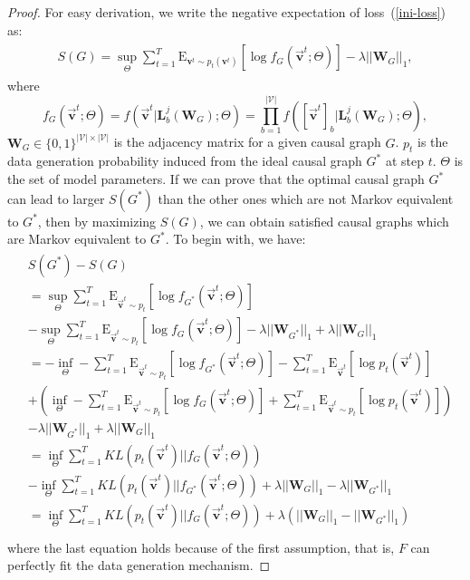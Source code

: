 \documentclass[conference]{IEEEtran}
\theoremstyle{definition}
\theoremstyle{theorem}
\theoremstyle{proof}
\theoremstyle{remark}
\begin{document}
\begin{proof}
	For easy derivation, we write the negative expectation of loss~(\ref{ini-loss}) as: 
		\begin{eqnarray}\label{noteee}
			\begin{aligned}
				S(G)\!=\!\sup_{\Theta} \sum_{t=1}^{T}\text{E}_{\bm{v}^t \sim p_t(\bm{v}^t)} [\log f_G(\vec{\bm{v}}^t;\Theta)] - \lambda||\bm{W}_G||_{1}\nonumber,
				\end{aligned}
			\end{eqnarray}
	where $$f_G(\vec{\bm{v}}^t;\Theta) = f(\vec{\bm{v}}^t|\bm{L}_b^j(\bm{W}_G);\Theta) = \prod_{b=1}^{|\mathcal{V}|}f([\vec{\bm{v}}^t]_b|\bm{L}_b^j(\bm{W}_G);\Theta),$$
	$\bm{W}_G\in \{0,1\}^{|\mathcal{V}|\times |\mathcal{V}|}$ is the adjacency matrix for a given causal graph $G$. 
	$p_t$ is the data generation probability induced from the ideal causal graph $G^*$ at step $t$. $\Theta$ is the set of model parameters.
	If we can {prove} that the optimal causal graph $G^*$ can lead to larger $S(G^*)$ than the other ones which are not Markov equivalent to $G^*$, then by {maximizing $S(G)$}, we can obtain satisfied causal graphs which are Markov equivalent to $G^*$.
	To begin with, we have:
	{\setlength\abovedisplayskip{3pt}
		\setlength\belowdisplayskip{3pt}
		\begin{eqnarray}\label{ourf}
			\begin{aligned}
				&S(G^*) - S(G)\\
				&=\sup_{\Theta} \sum_{t=1}^T \text{E}_{\vec{\bm{v}}^t \sim p_t}[\log f_{G^*}(\vec{\bm{v}}^t;\Theta)]\\
				&-\! \sup_{\Theta} \!\sum_{t=1}^T \!\text{E}_{\vec{\bm{v}}^t \sim p_t}[\log f_G(\vec{\bm{v}}^t;\Theta)]
			    -\lambda||\bm{W}_{G^*}||_{1}+ \lambda||\bm{W}_G||_{1}\\
				&=-\inf_{\Theta} -\sum_{t=1}^T \text{E}_{\vec{\bm{v}}^t\sim p_t} [\log f_{G^*}(\vec{\bm{v}}^t;\Theta)]- \sum_{t=1}^T\text{E}_{\vec{\bm{v}}^t} [\log p_t(\vec{\bm{v}}^t)]\\
				&+(\inf_{\Theta}-\sum_{t=1}^T \text{E}_{\vec{\bm{v}}^t\sim p_t} [\log f_G(\vec{\bm{v}}^t;\Theta)]+\sum_{t=1}^T \text{E}_{\vec{\bm{v}}^t\sim p_t} [\log p_t(\vec{\bm{v}}^t)])\\
				&- \lambda||\bm{W}_{G^*}||_{1} + \lambda||\bm{W}_G||_{1}\\
				&=\inf_{\Theta} \sum_{t=1}^T KL(p_t(\vec{\bm{v}}^t)||f_G(\vec{\bm{v}}^t;\Theta)) \\
				&-\inf_{\Theta} \sum_{t=1}^T KL(p_t(\vec{\bm{v}}^t)||f_{G^*}(\vec{\bm{v}}^t;\Theta))+ \lambda||\bm{W}_G||_{1}- \lambda||\bm{W}_{G^*}||_{1}\\
				&=\inf_{\Theta} \!\sum_{t=1}^T KL(p_t(\vec{\bm{v}}^t)||f_G(\vec{\bm{v}}^t;\Theta)) \!+\! \lambda(||\bm{W}_G||_{1}\!- \!||\bm{W}_{G^*}||_{1})\\\nonumber
			\end{aligned}
		\end{eqnarray}
	}
	where the last equation holds because of the first assumption, that is, $F$ can perfectly fit the data generation mechanism.
	

\end{proof}
\end{document}
